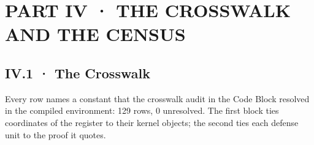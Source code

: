 \documentclass[10pt,twocolumn]{article}
\begin{document}
\onecolumn

\hypertarget{part-iv-the-crosswalk-and-the-census}{%
\section{PART IV · THE CROSSWALK AND THE
CENSUS}\label{part-iv-the-crosswalk-and-the-census}}

\hypertarget{iv.1-the-crosswalk}{%
\subsection{IV.1 · The Crosswalk}\label{iv.1-the-crosswalk}}

Every row names a constant that the crosswalk audit in the Code Block
resolved in the compiled environment: 129 rows, 0 unresolved. The first
block ties coordinates of the register to their kernel objects; the
second ties each defense unit to the proof it quotes.
\end{document}
